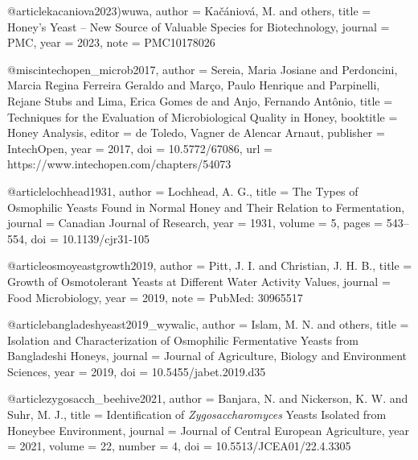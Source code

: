 @article{kacaniova2023)wuwa,
  author  = {Ka{\v{c}}{\'a}niov{\'a}, M. and others},
  title   = {{Honey's Yeast -- New Source of Valuable Species
              for Biotechnology}},
  journal = {PMC},
  year    = {2023},
  note    = {PMC10178026}
}



@misc{intechopen_microb2017,
    author    = {Sereia, Maria Josiane and Perdoncini, Marcia Regina Ferreira Geraldo
               and Março, Paulo Henrique and Parpinelli, Rejane Stubs
               and Lima, Erica Gomes de and Anjo, Fernando Antônio},
  title     = {Techniques for the Evaluation of Microbiological Quality in Honey},
  booktitle = {Honey Analysis},
  editor    = {de Toledo, Vagner de Alencar Arnaut},
  publisher = {IntechOpen},
  year      = {2017},
  doi       = {10.5772/67086},
  url       = {https://www.intechopen.com/chapters/54073}
}




@article{lochhead1931,
  author  = {Lochhead, A. G.},
  title   = {{The Types of Osmophilic Yeasts Found in Normal Honey
              and Their Relation to Fermentation}},
  journal = {Canadian Journal of Research},
  year    = {1931},
  volume  = {5},
  pages   = {543--554},
  doi     = {10.1139/cjr31-105}
}

@article{osmoyeastgrowth2019,
  author  = {Pitt, J. I. and Christian, J. H. B.},
  title   = {{Growth of Osmotolerant Yeasts at Different
              Water Activity Values}},
  journal = {Food Microbiology},
  year    = {2019},
  note    = {PubMed: 30965517}
}

@article{bangladeshyeast2019_wywalic,
  author  = {Islam, M. N. and others},
  title   = {{Isolation and Characterization of Osmophilic
              Fermentative Yeasts from Bangladeshi Honeys}},
  journal = {Journal of Agriculture, Biology and Environment Sciences},
  year    = {2019},
  doi     = {10.5455/jabet.2019.d35}
}

@article{zygosacch_beehive2021,
  author  = {Banjara, N. and Nickerson, K. W. and Suhr, M. J.},
  title   = {{Identification of \textit{Zygosaccharomyces} Yeasts
              Isolated from Honeybee Environment}},
  journal = {Journal of Central European Agriculture},
  year    = {2021},
  volume  = {22},
  number  = {4},
  doi     = {10.5513/JCEA01/22.4.3305}
}




